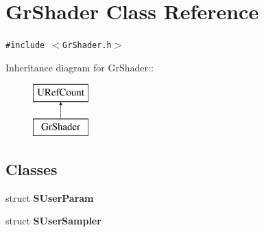 \hypertarget{class_gr_shader}{
\section{GrShader Class Reference}
\label{class_gr_shader}
}
{\tt \#include $<$GrShader.h$>$}

Inheritance diagram for GrShader::\begin{figure}[H]
\begin{center}
\leavevmode
\includegraphics[height=2cm]{class_gr_shader}
\end{center}
\end{figure}
\subsection*{Classes}
\begin{CompactItemize}
\item 
struct \textbf{SUserParam}
\item 
struct \textbf{SUserSampler}
\end{CompactItemize}
